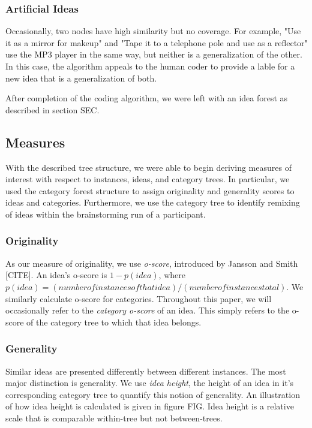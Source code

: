 \subsubsection{Artificial Ideas}
Occasionally, two nodes have high similarity but no coverage. For example, "Use it as a mirror for makeup" and "Tape it to a telephone pole and use as a reflector" use the MP3 player in the same way, but neither is a generalization of the other. In this case, the algorithm appeals to the human coder to provide a lable for a new idea that is a generalization of both.

After completion of the coding algorithm, we were left with an idea forest as described in section SEC.

\subsection{Measures}

With the described tree structure, we were able to begin deriving measures of interest with respect to instances, ideas, and category trees. In particular, we used the category forest structure to assign originality and generality scores to ideas and categories. Furthermore, we use the category tree to identify remixing of ideas within the brainstorming run of a participant.

\subsubsection{Originality}

As our measure of originality, we use \emph{o-score}, introduced by Jansson and Smith [CITE]. An idea's o-score is $1 - p(idea)$, where $p(idea) = (number of instances of that idea)/(number of instances total)$. We similarly calculate o-score for categories. Throughout this paper, we will occasionally refer to the \emph{category o-score} of an idea. This simply refers to the o-score of the category tree to which that idea belongs.

\subsubsection{Generality}

Similar ideas are presented differently between different instances. The most major distinction is generality. We use \emph{idea height}, the height of an idea in it's corresponding category tree to quantify this notion of generality. An illustration of how idea height is calculated is given in figure FIG. Idea height is a relative scale that is comparable within-tree but not between-trees.

